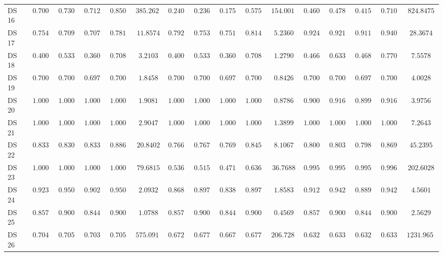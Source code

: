 {\begin{longtable}{|l|ccccc|ccccc|ccccc|}
		DS 16 & $\boldsymbol{0.7000}$ & $\boldsymbol{0.7300}$ & $\boldsymbol{0.7120}$ & $\boldsymbol{0.8500}$ & $385.2624$ & $0.2400$ & $0.2367$ & $0.1753$ & $0.5759$ & $154.0014$ & $0.4600$ & $0.4783$ & $0.4155$ & $0.7102$ & $824.8475$ \\
		DS 17 & $0.7547$ & $0.7091$ & $0.7071$ & $0.7818$ & $11.8574$ & $0.7925$ & $0.7530$ & $0.7518$ & $0.8148$ & $5.2360$ & $\boldsymbol{0.9245}$ & $\boldsymbol{0.9212}$ & $\boldsymbol{0.9111}$ & $\boldsymbol{0.9409}$ & $28.3674$ \\
		DS 18 & $0.4000$ & $0.5333$ & $0.3600$ & $0.7083$ & $3.2103$ & $0.4000$ & $0.5333$ & $0.3600$ & $0.7083$ & $1.2790$ & $0.4667$ & $0.6333$ & $0.4689$ & $0.7708$ & $7.5578$ \\
		DS 19 & $0.7000$ & $0.7000$ & $0.6970$ & $0.7000$ & $1.8458$ & $0.7000$ & $0.7000$ & $0.6970$ & $0.7000$ & $0.8426$ & $\boldsymbol{0.7000}$ & $\boldsymbol{0.7000}$ & $\boldsymbol{0.6970}$ & $\boldsymbol{0.7000}$ & $4.0028$ \\
		DS 20 & $\boldsymbol{1.0000}$ & $\boldsymbol{1.0000}$ & $\boldsymbol{1.0000}$ & $\boldsymbol{1.0000}$ & $1.9081$ & $1.0000$ & $1.0000$ & $1.0000$ & $1.0000$ & $0.8786$ & $0.9000$ & $0.9167$ & $0.8990$ & $0.9167$ & $3.9756$ \\
		DS 21 & $1.0000$ & $1.0000$ & $1.0000$ & $1.0000$ & $2.9047$ & $1.0000$ & $1.0000$ & $1.0000$ & $1.0000$ & $1.3899$ & $\boldsymbol{1.0000}$ & $\boldsymbol{1.0000}$ & $\boldsymbol{1.0000}$ & $\boldsymbol{1.0000}$ & $7.2643$ \\
		DS 22 & $\boldsymbol{0.8333}$ & $\boldsymbol{0.8304}$ & $\boldsymbol{0.8331}$ & $\boldsymbol{0.8869}$ & $20.8402$ & $0.7667$ & $0.7679$ & $0.7694$ & $0.8452$ & $8.1067$ & $0.8000$ & $0.8036$ & $0.7989$ & $0.8690$ & $45.2395$ \\
		DS 23 & $\boldsymbol{1.0000}$ & $\boldsymbol{1.0000}$ & $\boldsymbol{1.0000}$ & $\boldsymbol{1.0000}$ & $79.6815$ & $0.5365$ & $0.5157$ & $0.4710$ & $0.6368$ & $36.7688$ & $0.9957$ & $0.9957$ & $0.9959$ & $0.9968$ & $202.6028$ \\
		DS 24 & $0.9231$ & $0.9500$ & $0.9023$ & $0.9500$ & $2.0932$ & $0.8681$ & $0.8976$ & $0.8385$ & $0.8976$ & $1.8583$ & $0.9121$ & $0.9429$ & $0.8897$ & $0.9429$ & $4.5601$ \\
		DS 25 & $0.8571$ & $0.9000$ & $0.8444$ & $0.9000$ & $1.0788$ & $0.8571$ & $0.9000$ & $0.8444$ & $0.9000$ & $0.4569$ & $0.8571$ & $0.9000$ & $0.8444$ & $0.9000$ & $2.5629$ \\
		DS 26 & $\boldsymbol{0.7040}$ & $\boldsymbol{0.7058}$ & $\boldsymbol{0.7039}$ & $\boldsymbol{0.7058}$ & $575.0917$ & $0.6720$ & $0.6776$ & $0.6678$ & $0.6776$ & $206.7283$ & $0.6320$ & $0.6333$ & $0.6320$ & $0.6333$ & $1231.9654$ \\

\end{longtable}}
